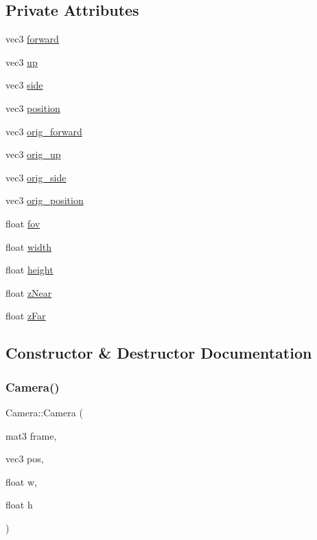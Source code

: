 \subsection*{Private Attributes}
\begin{DoxyCompactItemize}
\item 
vec3 \mbox{\hyperlink{classCamera_a8bc7972da69be47469f8ee52b6647fe0}{forward}}
\item 
vec3 \mbox{\hyperlink{classCamera_aff4fd1aa62994840f7742b698f15313e}{up}}
\item 
vec3 \mbox{\hyperlink{classCamera_a933d8f284b441a9baf9357a597006b12}{side}}
\item 
vec3 \mbox{\hyperlink{classCamera_a6bd96884fb5fb652b71042f2d7f0122c}{position}}
\item 
vec3 \mbox{\hyperlink{classCamera_ab48d54798c32b71018ad474085f773d7}{orig\+\_\+forward}}
\item 
vec3 \mbox{\hyperlink{classCamera_a526c419473d3a8a22011644399520d9a}{orig\+\_\+up}}
\item 
vec3 \mbox{\hyperlink{classCamera_a23882638c942fb89d6a307a3478eb76e}{orig\+\_\+side}}
\item 
vec3 \mbox{\hyperlink{classCamera_aca4635de7bd810e41e698c359777d4b6}{orig\+\_\+position}}
\item 
float \mbox{\hyperlink{classCamera_aff7393c9cfbccd7e369091f00008da93}{fov}}
\item 
float \mbox{\hyperlink{classCamera_a6fd29b8dd0cff815956c30f310a9b610}{width}}
\item 
float \mbox{\hyperlink{classCamera_a956ccfce53f1bced41a82f6a4c6cd99a}{height}}
\item 
float \mbox{\hyperlink{classCamera_a1db2166635ff27594eda3a23130b66ac}{z\+Near}}
\item 
float \mbox{\hyperlink{classCamera_a6290469f972a5903c805725db563f41f}{z\+Far}}
\end{DoxyCompactItemize}


\subsection{Constructor \& Destructor Documentation}
\mbox{\label{classCamera_af50a1edab8d04a870747c6d52ad7e51e}} 
\subsubsection{\texorpdfstring{Camera()}{Camera()}\hspace{0.1cm}{\footnotesize\ttfamily [1/2]}}
{\footnotesize\ttfamily Camera\+::\+Camera (\begin{DoxyParamCaption}\item[{mat3}]{frame,  }\item[{vec3}]{pos,  }\item[{float}]{w,  }\item[{float}]{h }\end{DoxyParamCaption})}

